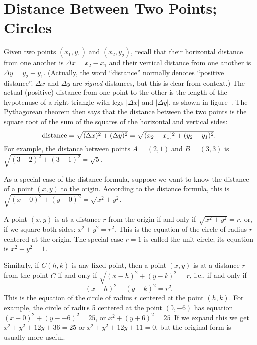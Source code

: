 \section{Distance Between Two Points; Circles}{}{}

Given two points $(x_1,y_1)$ and $(x_2,y_2)$, recall that their
horizontal distance from one another is $\Delta x=x_2-x_1$ and their
vertical distance from one another is $\Delta y=y_2-y_1$.  (Actually,
the word ``distance'' normally denotes ``positive distance''. $\Delta
x$ and $\Delta y$ are {\it signed\/} distances, but this is clear from
context.)  The actual (positive) distance from one point to the other
is the length of the hypotenuse of a right triangle with legs $|\Delta
x|$ and $|\Delta y|$, as shown in figure~.  The Pythagorean theorem then says that the distance between
the two points is the square root of the sum of the squares of the
horizontal and vertical sides:
$$
  \hbox{distance}
    =\sqrt{(\Delta x)^2+(\Delta y)^2}=\sqrt{(x_2-x_1)^2+ (y_2-y_1)^2}.
$$
For example, the distance between points $A=(2,1)$ and $B=(3,3)$ is
$\sqrt{(3-2)^2+(3-1)^2}=\sqrt{5}$.


As a special case of the distance formula, suppose we want to know the
distance of a point $(x,y)$ to the origin.  According to the distance
formula, this is $\sqrt{(x-0)^2+(y-0)^2}=\sqrt{x^2+y^2}$.

A point $(x,y)$ is at a distance $r$ from the origin if and only if
$\sqrt{x^2+y^2}=r$, or, if we square both sides: $x^2+y^2=r^2$.  This is
the equation of the circle 
of radius $r$ centered at the origin.
The special case $r=1$ is called the unit 
circle; 
its equation is
$x^2+y^2=1$.

Similarly, if $C(h,k)$ is any fixed point, then a point $(x,y)$ is at a
distance $r$ from the point $C$ if and only if $\sqrt{(x-h)^2+(y-k)^2}=r$,
i.e., if and only if 
$$
(x-h)^2+(y-k)^2=r^2.
$$
This is the equation of the circle 
of radius $r$ centered at the
point $(h,k)$.  For example, the circle of radius 5 centered at the
point $(0,-6)$ has equation $(x-0)^2+(y--6)^2=25$, or
$x^2+(y+6)^2=25$.  If we
expand this we get $x^2+y^2+12y+36=25$ or 
$x^2+y^2+12y+11=0$, but the original form is usually more useful.


